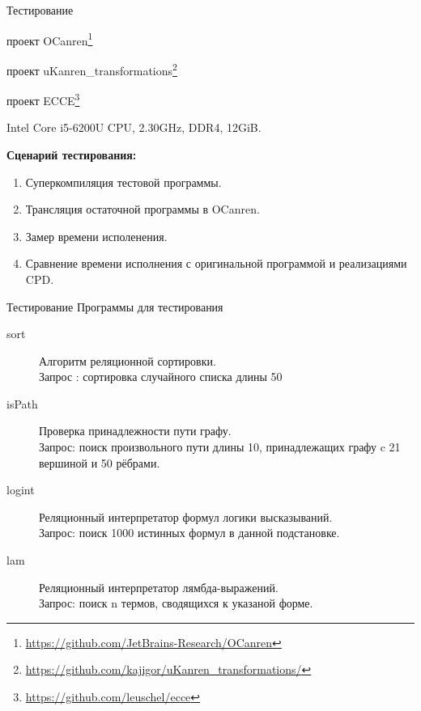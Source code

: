 \documentclass[xcolor=table]{beamer}
\begin{document}
%
\begin{frame}{Тестирование}

\begin{description}[leftmargin=!]
\item[Реализация miniKanren:] проект OCanren\footnote{\url{https://github.com/JetBrains-Research/OCanren}}\\
\item[Реализация CPD для miniKanren:] проект uKanren\_transformations\footnote{\url{https://github.com/kajigor/uKanren_transformations/}}
\item[Реализация CPD для Prolog:] проект ECCE\footnote{\url{https://github.com/leuschel/ecce}}
\item[Платформа:] Intel Core i5-6200U CPU, 2.30GHz, DDR4, 12GiB.
\end{description}
{\bf Сценарий тестирования:}
\begin{enumerate}
\item Суперкомпиляция тестовой программы.
\item Трансляция остаточной программы в OCanren.
\item Замер времени исполенения.
\item Сравнение времени исполнения с оригинальной программой и реализациями CPD.
\end{enumerate}
\end{frame}
%
\begin{frame}{Тестирование}
{\small Программы для тестирования}
\begin{description}
\item[sort]Алгоритм реляционной сортировки.\\
      Запрос : сортировка случайного списка длины 50
\item[isPath] Проверка принадлежности пути графу.\\
      Запрос: поиск  произвольного пути длины 10, принадлежащих графу c 21 вершиной и 50 рёбрами.
\item[logint] Реляционный интерпретатор формул логики высказываний.\\
      Запрос: поиск 1000 истинных формул в данной подстановке.
\item[lam] Реляционный интерпретатор лямбда-выражений.\\
      Запрос: поиск n термов, сводящихся к указаной форме.
\end{description}
\end{frame}
\end{document}
